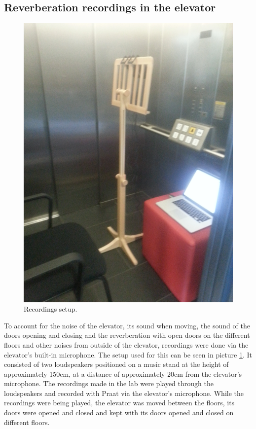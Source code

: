 \subsection{Reverberation recordings in the elevator}

\begin{figure}[h]
\hspace*{3cm}\includegraphics[scale=0.15]{setup_reverberation_rec.jpg}
\caption{Recordings setup.}
\label{fig:recordingsetup}
\end{figure}



\noindent To account for the noise of the elevator, its sound when moving, the sound of the doors opening and closing and the reverberation with open doors on the different floors and other noises from outside of the elevator, recordings were done via the elevator's built-in microphone. 
The setup used for this can be seen in picture \ref{fig:recordingsetup}.
It consisted of two loudspeakers positioned on a music stand at the height of approximately 150cm, at a distance of approximately 20cm from the elevator's microphone. 
The recordings made in the lab were played through the loudspeakers and recorded with Praat via the elevator's microphone. 
While the recordings were being played, the elevator was moved between the floors, its doors were opened and closed and kept with its doors opened and closed on different floors.

